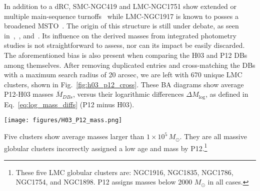 \documentclass[referee]{aa}
\begin{document}
In addition to a dRC, SMC-NGC419 and LMC-NGC1751 show extended or multiple
main-sequence turnoffs~\citep[MSTO; see:][]
{Glatt_2008,Milone_2009,Rubele_2010,Rubele_2011,Girardi_2011}
while LMC-NGC1917 is known to posses a broadened MSTO~\citep{Milone_2009}.
The origin of this structure is still under debate, as seen in~\cite
{Piatti_Bastian_2016},~\cite{Milone_2016}, and~\cite{Li_2016}.
Its influence on the derived masses from integrated photometry studies is not
straightforward to assess, nor can its impact be easily discarded.\\

%
%
The aforementioned bias is also present when comparing the H03 and P12 DBs among
themselves.
%
After removing duplicated entries and cross-matching the DBs with
a maximum search radius of 20 arcsec, we are left with 670 unique LMC clusters,
shown in Fig.~\ref{fig:h03_p12_cross}.
These BA diagrams show average P12-H03 masses $\overline{M}_{DBs}$,
versus their logarithmic differences $\Delta M_{\log}$, as defined in
Eq.~\ref{eq:log_mass_diffs} (P12 minus H03).
%
\begin{figure*}
\texttt{[image: figures/H03\_P12\_mass.png]}
\caption{\emph{Left}: BA plot for the logarithmic mass differences between P12
and H03, for average mass values below 1000 $M_{\odot}$. Clusters are
colored according to the difference in their logarithmic ages by each
DB, in the sense P12 minus H03; see colorbar in right plot. Mean and standard
deviation $\Delta M_{\log}$ are shown as a dashed black line and a gray region,
respectively.
\emph{Center}: idem, for average DB masses $1000<\overline{M}_{DB}<10000\,(M_
{\odot})$.
\emph{Right}: idem, for average DB masses $\overline{M}_{DB}>10000\,(M_
{\odot})$.}
\label{fig:h03_p12_cross}
\end{figure*}
%
Five clusters show average masses larger than $1{\times}10^5\,M_{\odot}$.
They are all massive globular clusters incorrectly assigned a low age and mass
by P12.\footnote{These five LMC globular clusters
are: NGC1916, NGC1835, NGC1786, NGC1754, and NGC1898. P12 assigns masses
below 2000 $M_{\odot}$ in all cases.}
\end{document}
